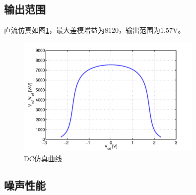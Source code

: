 \documentclass[a4paper]{article}
\newcommand{\uV}{\si{\volt}}
\begin{document}
\subsection{输出范围}
直流仿真如图\ref{commondc}，最大差模增益为$8120$，输出范围为$1.57\uV$。
\begin{figure}[htb]
    \begin{center}
        \includegraphics[width=0.8\textwidth]{common/dc.pdf}
    \end{center}
    \caption{DC仿真曲线}
    \label{commondc}
\end{figure}

\newpage
\clearpage
\subsection{噪声性能}
\end{document}
